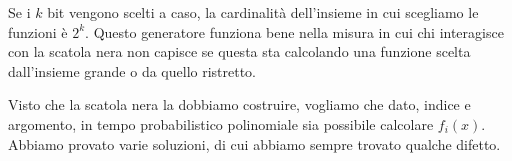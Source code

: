 Se i $k$ bit vengono scelti a caso, la cardinalità dell'insieme in cui scegliamo le funzioni è $2^k$. Questo generatore funziona bene nella misura in cui chi interagisce con la scatola nera non capisce se questa sta calcolando una funzione scelta dall'insieme grande o da quello ristretto. 

Visto che la scatola nera la dobbiamo costruire, vogliamo che dato, indice e argomento, in tempo probabilistico polinomiale sia possibile calcolare $f_i(x)$. Abbiamo provato varie soluzioni, di cui abbiamo sempre trovato qualche difetto. 






